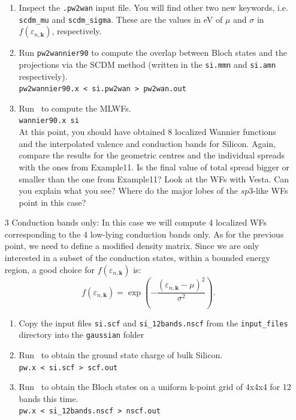 \documentclass[a4paper,11pt,twoside]{article}
\begin{document}
\begin{itemize}
\begin{enumerate}
    \item Inspect the {\tt .pw2wan} input file. You will find other two new keywords, i.e. {\tt scdm\_mu} and {\tt scdm\_sigma}. These are the values in eV of $\mu$ and $\sigma$ in $f(\varepsilon_{n,\mathbf{k}})$, respectively.
    \item Run {\tt pw2wannier90} to compute the overlap between Bloch
    states and the projections via the SCDM method (written in the
    {\tt si.mmn} and {\tt si.amn} respectively).\\  
    {\tt pw2wannier90.x < si.pw2wan > pw2wan.out}

    \item Run \wannier\ to compute the MLWFs.\\
    {\tt wannier90.x si}\\
    At this point, you should have obtained 8 localized Wannier functions and the interpolated valence and conduction bands for Silicon. Again, compare the results for the geometric centres and the individual spreads with the ones from Example11. Is the final value of total spread bigger or smaller than the one from Example11? Look at the WFs with Vesta. Can you explain what you see? Where do the major lobes of the $sp3$-like WFs point in this case?  
  \end{enumerate}
  \item[3]{Conduction bands only: In this case we will compute 4 localized WFs corresponding to the 4 low-lying conduction bands only. As for the previous point, we need to define a modified density matrix\cite{LinLin-ArXiv2017}. Since we are only interested in a subset of the conduction states, within a bounded energy region, a good choice for $f(\varepsilon_{n,\mathbf{k}})$ is: $$f(\varepsilon_{n,\mathbf{k}}) = \exp\left(-\frac{(\varepsilon_{n,\mathbf{k}} - \mu)^2}{\sigma^2}\right).$$}
    \begin{enumerate}
    \item Copy the input files {\tt si.scf} and {\tt si\_12bands.nscf} from the {\tt input\_files} directory into the {\tt gaussian} folder
    \item Run \pwscf\ to obtain the ground state charge of bulk Silicon. \\
    {\tt pw.x < si.scf > scf.out}

    \item Run \pwscf\ to obtain the Bloch states on a uniform k-point grid of 4x4x4 for 12 bands this time. \\
    {\tt pw.x < si\_12bands.nscf > nscf.out}
    

\end{enumerate}
\end{itemize}
\end{document}
